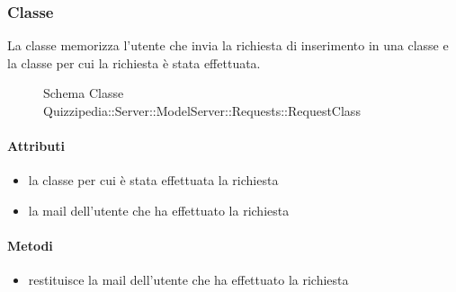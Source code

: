 \subsubsection{Classe }
La classe memorizza l'utente che invia la richiesta di inserimento in una classe e la classe per cui la richiesta è stata effettuata.
\begin{figure}[H]
\centering
\noindent{}
\caption[Schema Classe RequestClass]{Schema Classe Quizzipedia::Server::ModelServer::Requests::RequestClass}
\end{figure}
\paragraph{Attributi}
\begin{itemize}
\item {}
\newline
la classe per cui è stata effettuata la richiesta
\item {}
\newline
la mail dell'utente che ha effettuato la richiesta
\end{itemize}
\paragraph{Metodi}
\begin{itemize}
\item {}
\newline
restituisce la mail dell'utente che ha effettuato la richiesta
\newline
\end{itemize}
